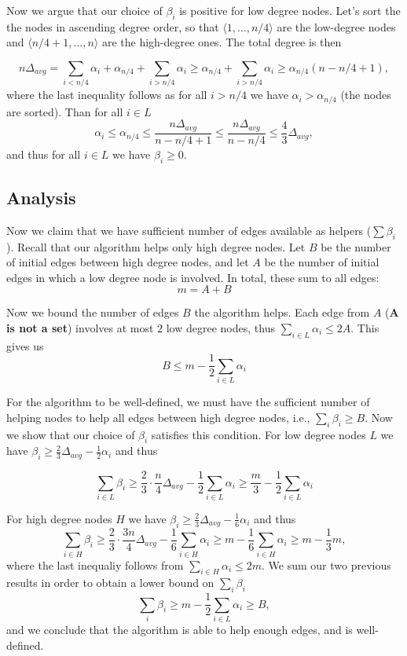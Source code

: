 \documentclass{article}
\begin{document}
\medskip

Now we argue that our choice of $\beta_i$ is positive for low degree nodes.
Let's sort the the nodes in ascending degree order, so that $\langle 1, \ldots, n/4\rangle$ are the low-degree nodes and
$\langle n/4 +1, \ldots, n\rangle$  are the high-degree ones.
The total degree is then

$$n\Delta_{avg} = \sum_{i < n/4} \alpha_i + \alpha_{n/4} + \sum_{i > n/4} \alpha_i \geq \alpha_{n/4} + \sum_{i > n/4} \alpha_i \geq \alpha_{n/4}(n-n/4+1),$$
where the last inequality follows as 
for all $i > n/4$ we have $\alpha_i > \alpha_{n/4}$ (the nodes are sorted).
Than for all $i \in L$
$$\alpha_i \leq \alpha_{n/4} \leq \frac{n\Delta_{avg}}{n-n/4+1} \leq \frac{n\Delta_{avg}}{n-n/4} \leq \frac{4}{3}\Delta_{avg},$$
and thus for all $i \in L$ we have $\beta_i \geq 0$.

\subsection{Analysis}

Now we claim that we have sufficient number of edges available as helpers ($\sum \beta_i$).
Recall that our algorithm helps only high degree nodes.
Let $B$ be the number of initial edges between high degree nodes, and let $A$ be the number of initial edges in which a low degree node is involved.
In total, these sum to all edges:
$$m = A + B$$

Now we bound the number of edges $B$ the algorithm helps.
Each edge from $A$ (\textbf{A is not a set}) involves at most $2$ low degree nodes, thus
$\sum_{i \in L}\alpha_i \leq 2A$.
This gives us
$$B \leq m - \frac{1}{2}\sum_{i \in L}\alpha_i$$

For the algorithm to be well-defined, we must have the sufficient number of helping nodes to help all edges between high degree nodes, i.e., $\sum_i \beta_i \geq B$.
Now we show that our choice of $\beta_i$ satisfies this condition.
For low degree nodes $L$ we have   $\beta_i \geq \frac{2}{3}\Delta_{avg}-\frac{1}{2}\alpha_i$
and thus

  $$\sum_{i \in L}\beta_i \geq \frac{2}{3}\cdot\frac{n}{4}\Delta_{avg} - \frac{1}{2}\sum_{i \in L}\alpha_i \geq \frac{m}{3} - \frac{1}{2}\sum_{i \in L}\alpha_i$$

For high degree nodes $H$ we have 
  $\beta_i \geq \frac{2}{3}\Delta_{avg}-\frac{1}{6}\alpha_i$
  and thus
  $$\sum_{i \in H}\beta_i \geq \frac{2}{3}\cdot\frac{3n}{4}\Delta_{avg} - \frac{1}{6}\sum_{i \in H}\alpha_i \geq m - \frac{1}{6}\sum_{i \in H}\alpha_i \geq m - \frac{1}{3}m,$$
  where the last inequaliy follows from $\sum_{i \in H}\alpha_i \leq 2m$.
We sum our two previous results in order to obtain a lower bound on
$\sum_{i}\beta_i$
$$\sum_{i}\beta_i \geq m - \frac{1}{2}\sum_{i \in L}\alpha_i \geq B,$$
and we conclude that the algorithm is able to help enough edges, and is well-defined.
\end{document}
